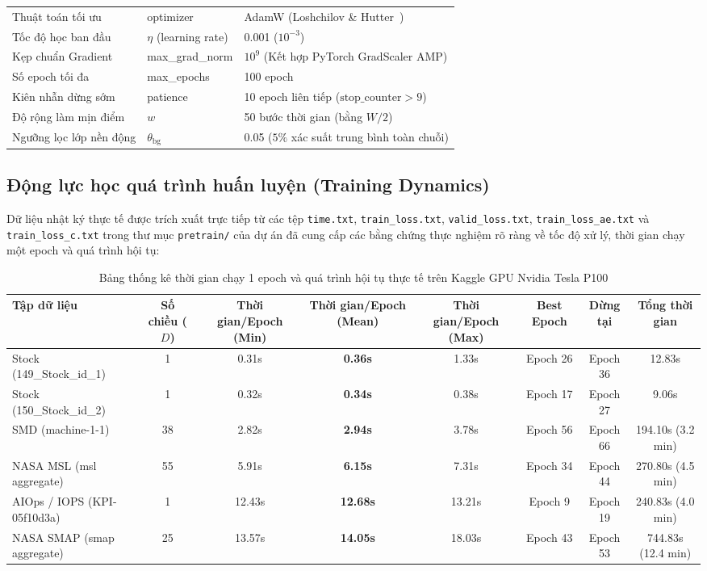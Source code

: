 \documentclass[11pt,journal,onecolumn]{IEEEtran}
\begin{document}
\begin{table}[htbp]
\begin{tabular}{llp{7.0cm}}
Thuật toán tối ưu & optimizer & AdamW (Loshchilov \& Hutter~\cite{loshchilov2019decoupled}) \\
Tốc độ học ban đầu & $\eta$ (learning rate) & 0.001 ($10^{-3}$) \\
Kẹp chuẩn Gradient & max\_grad\_norm & $10^9$ (Kết hợp PyTorch GradScaler AMP) \\
Số epoch tối đa & max\_epochs & 100 epoch \\
Kiên nhẫn dừng sớm & patience & 10 epoch liên tiếp ($\text{stop\_counter} > 9$) \\
Độ rộng làm mịn điểm & $w$ & 50 bước thời gian (bằng $W / 2$) \\
Ngưỡng lọc lớp nền động & $\theta_{\text{bg}}$ & 0.05 ($5\%$ xác suất trung bình toàn chuỗi) \\
\bottomrule
\end{tabular}
\end{table}

\subsection{Động lực học quá trình huấn luyện (Training Dynamics)}
\label{subsec:training_dynamics}
Dữ liệu nhật ký thực tế được trích xuất trực tiếp từ các tệp \texttt{time.txt}, \texttt{train\_loss.txt}, \texttt{valid\_loss.txt}, \texttt{train\_loss\_ae.txt} và \texttt{train\_loss\_c.txt} trong thư mục \texttt{pretrain/} của dự án đã cung cấp các bằng chứng thực nghiệm rõ ràng về tốc độ xử lý, thời gian chạy một epoch và quá trình hội tụ:

\begin{table}[htbp]
\centering
\caption{Bảng thống kê thời gian chạy 1 epoch và quá trình hội tụ thực tế trên Kaggle GPU Nvidia Tesla P100}
\label{tab:training_dynamics}
\begin{tabular}{lccccccc}
\toprule
\textbf{Tập dữ liệu} & \textbf{Số chiều ($D$)} & \textbf{Thời gian/Epoch (Min)} & \textbf{Thời gian/Epoch (Mean)} & \textbf{Thời gian/Epoch (Max)} & \textbf{Best Epoch} & \textbf{Dừng tại} & \textbf{Tổng thời gian} \\
\midrule
Stock (149\_Stock\_id\_1) & 1 & 0.31s & \textbf{0.36s} & 1.33s & Epoch 26 & Epoch 36 & 12.83s \\
Stock (150\_Stock\_id\_2) & 1 & 0.32s & \textbf{0.34s} & 0.38s & Epoch 17 & Epoch 27 & 9.06s \\
SMD (machine-1-1) & 38 & 2.82s & \textbf{2.94s} & 3.78s & Epoch 56 & Epoch 66 & 194.10s (3.2 min) \\
NASA MSL (msl aggregate) & 55 & 5.91s & \textbf{6.15s} & 7.31s & Epoch 34 & Epoch 44 & 270.80s (4.5 min) \\
AIOps / IOPS (KPI-05f10d3a) & 1 & 12.43s & \textbf{12.68s} & 13.21s & Epoch 9 & Epoch 19 & 240.83s (4.0 min) \\
NASA SMAP (smap aggregate) & 25 & 13.57s & \textbf{14.05s} & 18.03s & Epoch 43 & Epoch 53 & 744.83s (12.4 min) \\
\bottomrule
\end{tabular}
\end{table}
\end{document}
